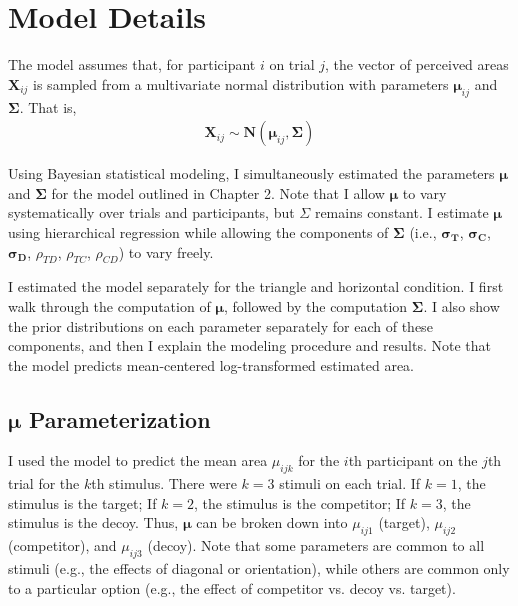 \section{Model Details}

The model assumes that, for participant $i$ on trial $j$, the vector of perceived areas $\boldsymbol{X}_{ij}$ is sampled from a multivariate normal distribution with parameters $\boldsymbol{\mu}_{ij}$ and $\boldsymbol{\Sigma}$. That is,
\begin{align}
    \boldsymbol{X}_{ij} \sim \mathcal{\textbf{N}}(\boldsymbol{\mu}_{ij},\boldsymbol{\Sigma})
\end{align}

Using Bayesian statistical modeling, I simultaneously estimated the parameters  $\boldsymbol{\mu}$ and $\boldsymbol{\Sigma}$ for the model outlined in Chapter 2. Note that I allow $\boldsymbol{\mu}$ to vary systematically over trials and participants, but $\Sigma$ remains constant. I estimate $\boldsymbol{\mu}$ using hierarchical regression while allowing the components of $\boldsymbol{\Sigma}$ (i.e., $\boldsymbol{\sigma_{T}}$, $\boldsymbol{\sigma_{C}}$, $\boldsymbol{\sigma_{D}}$, $\rho_{TD}$, $\rho_{TC}$, $\rho_{CD}$) to vary freely. 

I estimated the model separately for the triangle and horizontal condition. I first walk through the computation of $\boldsymbol{\mu}$, followed by the computation $\boldsymbol{\Sigma}$. I also show the prior distributions on each parameter separately for each of these components, and then I explain the modeling procedure and results. Note that the model predicts mean-centered log-transformed estimated area.

\subsection{\texorpdfstring{$\boldsymbol{\mu}$}{mu} Parameterization}

I used the model to predict the mean area $\mu_{ijk}$ for the $i$th participant on the $j$th trial for the $k$th stimulus. There were $k=3$ stimuli on each trial. If $k=1$, the stimulus is the target; If $k=2$, the stimulus is the competitor; If $k=3$, the stimulus is the decoy. Thus, $\boldsymbol{\mu}$ can be broken down into $\mu_{ij1}$ (target), $\mu_{ij2}$ (competitor), and $\mu_{ij3}$ (decoy). Note that some parameters are common to all stimuli (e.g., the effects of diagonal or orientation), while others are common only to a particular option (e.g., the effect of competitor vs. decoy vs. target). 

